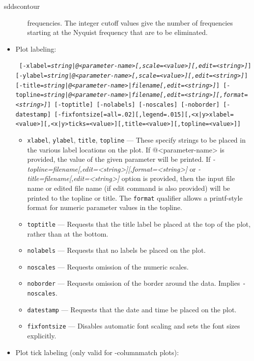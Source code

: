 \begin{sddsprog}{sddscontour}
\begin{itemize}
\begin{itemize}
        frequencies.  The integer cutoff values give the number of frequencies starting at the Nyquist frequency
        that are to be eliminated.
        \end{itemize}
    \item Plot labeling:
\begin{flushleft}{\tt
[-xlabel={\em string|@<parameter-name>[,scale=<value>][,edit=<string>]}]
[-ylabel={\em string|@<parameter-name>[,scale=<value>][,edit=<string>]}]
[-title={\em string|@<parameter-name>|filename[,edit=<string>]}]
[-topline={\em string|@<parameter-name>|filename[,edit=<string>][,format=<string>]}]
[-toptitle] [-nolabels] [-noscales] [-noborder] [-datestamp]
[-fixfontsize[=all=.02][,legend=.015][,<x|y>xlabel=<value>][,<x|y>ticks=<value>][,title=<value>][,topline=<value>]]
}\end{flushleft}
        \begin{itemize}
        \item \verb|xlabel|, \verb|ylabel|, \verb|title|, \verb|topline| --- These specify strings to be placed
                in the various label locations on the plot. If @<parameter-name> is provided, the value of the
                given parameter will be printed.  If {\em -topline=filename[,edit=<string>][,format=<string>]} or
                {\em -title=filename[,edit=<string>]} option is provided, then the input file name or edited file
                name (if edit command is also provided) will be printed to the topline or title.  The
                \verb|format| qualifier allows a printf-style format for numeric parameter values in the topline.
        \item \verb|toptitle| --- Requests that the title label be placed at the top of the plot, rather than
                at the bottom.
        \item \verb|nolabels| --- Requests that no labels be placed on the plot.
        \item \verb|noscales| --- Requests omission of the numeric scales.
        \item \verb|noborder| --- Requests omission of the border around the data.  Implies \verb|-noscales|.
        \item \verb|datestamp| --- Requests that the date and time be placed on the plot.
        \item \verb|fixfontsize| --- Disables automatic font scaling and sets the font sizes explicitly.
        \end{itemize}
    \item Plot tick labeling (only valid for -columnmatch plots):

\end{itemize}
\end{sddsprog}
